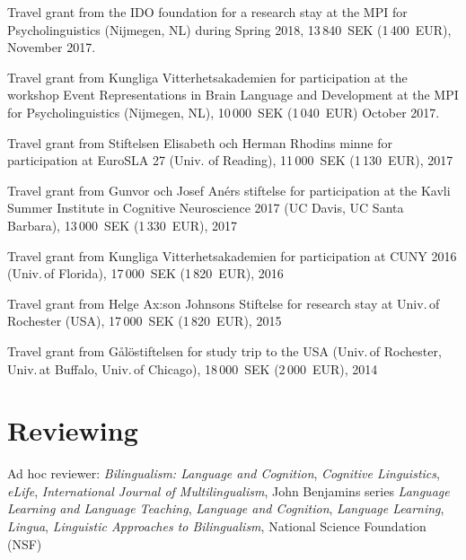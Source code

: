 \documentclass[margin, 11pt]{res} %
\begin{document}
\begin{resume}
Travel grant from the IDO foundation for a research stay at the MPI for Psycholinguistics (Nijmegen, NL) during Spring 2018, 13\,840~SEK (1\,400~EUR), November 2017.

Travel grant from Kungliga Vitterhetsakademien for participation at the workshop Event Representations in Brain Language and Development at the MPI for Psycholinguistics (Nijmegen, NL), 10\,000~SEK (1\,040~EUR) October 2017.

Travel grant from Stiftelsen Elisabeth och Herman Rhodins minne for participation at EuroSLA 27 (Univ. of Reading), 11\,000~SEK (1\,130~EUR), 2017

Travel grant from Gunvor och Josef An\'{e}rs stiftelse for participation at the Kavli Summer Institute in Cognitive Neuroscience 2017 (UC Davis, UC Santa Barbara), 13\,000~SEK (1\,330~EUR), 2017

Travel grant from Kungliga Vitterhetsakademien for participation at CUNY 2016 (Univ.\,of Florida), 17\,000~SEK (1\,820~EUR), 2016

Travel grant from Helge Ax:son Johnsons Stiftelse for research stay at Univ.\,of Rochester (USA), 17\,000~SEK (1\,820~EUR), 2015

Travel grant from G\aa l\"{o}stiftelsen for study trip to the USA (Univ.\,of Rochester, Univ.\,at Buffalo, Univ.\,of Chicago), 18\,000~SEK (2\,000~EUR), 2014
 











\section{\sc Reviewing}

Ad hoc reviewer: 
\textit{Bilingualism: Language and Cognition},
\textit{Cognitive Linguistics},
\textit{eLife},
\textit{International Journal of Multilingualism},
John Benjamins series \textit{Language Learning and Language Teaching},
\textit{Language and Cognition},
\textit{Language Learning},
\textit{Lingua},
\textit{Linguistic Approaches to Bilingualism},
National Science Foundation (NSF)




\end{resume}
\end{document}
